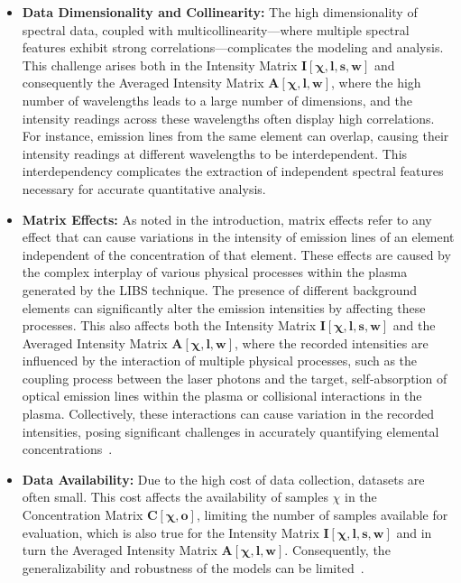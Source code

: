 \begin{itemize}
    \item \textbf{Data Dimensionality and Collinearity:} The high dimensionality of spectral data, coupled with multicollinearity—where multiple spectral features exhibit strong correlations—complicates the modeling and analysis. 
    This challenge arises both in the Intensity Matrix $\mathbf{I[\chi, l, s, w]}$ and consequently the Averaged Intensity Matrix $\mathbf{A[\chi, l, w]}$, where the high number of wavelengths leads to a large number of dimensions, and the intensity readings across these wavelengths often display high correlations.
    For instance, emission lines from the same element can overlap, causing their intensity readings at different wavelengths to be interdependent\cite{andersonImprovedAccuracyQuantitative2017}. 
    This interdependency complicates the extraction of independent spectral features necessary for accurate quantitative analysis.

    \item \textbf{Matrix Effects:} As noted in the introduction, matrix effects refer to any effect that can cause variations in the intensity of emission lines of an element independent of the concentration of that element. 
    These effects are caused by the complex interplay of various physical processes within the plasma generated by the LIBS technique. The presence of different background elements can significantly alter the emission intensities by affecting these processes.
    This also affects both the Intensity Matrix $\mathbf{I[\chi, l, s, w]}$ and the Averaged Intensity Matrix $\mathbf{A[\chi, l, w]}$, where the recorded intensities are influenced by the interaction of multiple physical processes, such as the coupling process between the laser photons and the target, self-absorption of optical emission lines within the plasma or collisional interactions in the plasma.
    Collectively, these interactions can cause variation in the recorded intensities, posing significant challenges in accurately quantifying elemental concentrations~\cite{cleggRecalibrationMarsScience2017, andersonImprovedAccuracyQuantitative2017}.
    
    \item \textbf{Data Availability:} Due to the high cost of data collection, datasets are often small. 
    This cost affects the availability of samples $\chi$ in the Concentration Matrix $\mathbf{C[\chi, o]}$, limiting the number of samples available for evaluation, which is also true for the Intensity Matrix $\mathbf{I[\chi, l, s, w]}$ and in turn the Averaged Intensity Matrix $\mathbf{A[\chi, l, w]}$. 
    Consequently, the generalizability and robustness of the models can be limited~\cite{p9_paper}.
\end{itemize}

